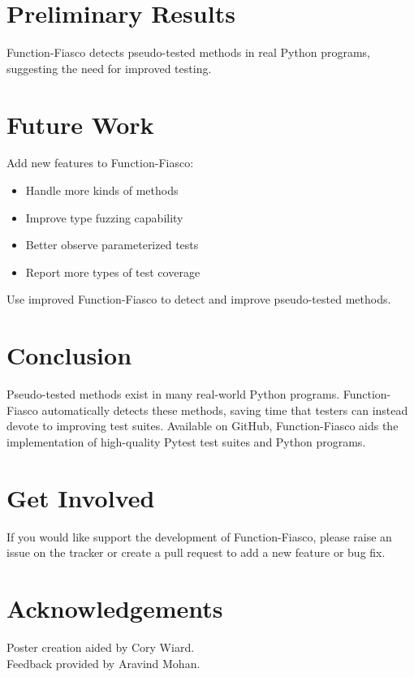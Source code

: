 \documentclass[a0paper,fleqn]{betterposter}
\begin{document}
{  \vspace*{-.5in}
  \section{Preliminary Results}

  \vspace*{-1in}


  \vspace*{-.5in}

  Function-Fiasco detects pseudo-tested methods in real Python programs,
  suggesting the need for improved testing.

  \section{Future Work}
  Add new features to Function-Fiasco: \\
  \vspace*{-.5in}

  \begin{itemize}[leftmargin=*]

    \item{Handle more kinds of methods}
    \item{Improve type fuzzing capability}
    \item{Better observe parameterized tests}
    \item{Report more types of test coverage}

  \end{itemize}

  \vspace{.5em}
  Use improved Function-Fiasco to detect and improve pseudo-tested methods.

  \section{Conclusion}
  Pseudo-tested methods exist in many real-world Python programs.
  Function-Fiasco automatically detects these methods, saving time that testers
  can instead devote to improving test suites.
  Available on GitHub, Function-Fiasco aids the implementation of high-quality
  Pytest test suites and Python programs.

  \section{Get Involved}
  If you would like support the development of Function-Fiasco, please raise an
  issue on the tracker or create a pull request to add a new feature or bug
  fix.
  \vfill

  \section{Acknowledgements}
  Poster creation aided by Cory Wiard.\\
  Feedback provided by Aravind Mohan.\\


}
\end{document}
